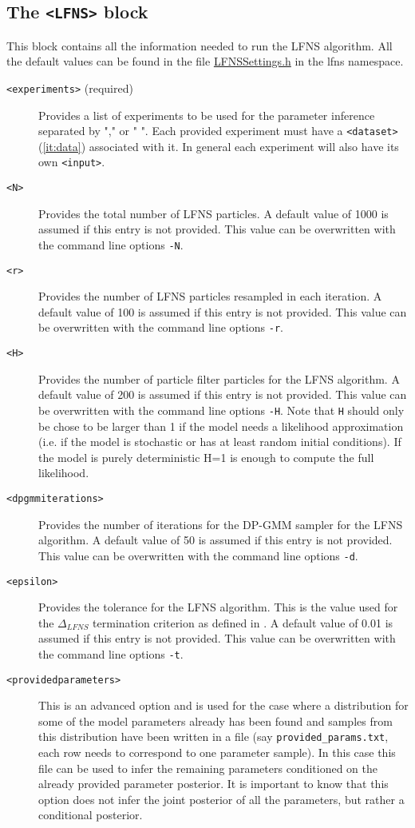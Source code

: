 \documentclass[11pt]{article} %
\begin{document}
\subsection{The \texttt{<LFNS>} block}
This block contains all the information needed to run the LFNS algorithm. All the default values can be found in the file \href{https://github.com/Mijan/LFNS/blob/publishable/src/LFNS/LFNSSettings.h}{LFNSSettings.h} in the lfns namespace. 
\begin{description}
\item[\texttt{<experiments>} (required)] Provides a list of experiments to be used for the parameter inference separated by "," or " ". Each provided experiment must have a \texttt{<dataset>} (\ref{it:data}) associated with it. In general each experiment will also have its own \texttt{<input>}. 
\item[\texttt{<N>}] Provides the total number of LFNS particles. A default value of 1000 is assumed if this entry is not provided. This value can be overwritten with the command line options \texttt{-N}.   
\item[\texttt{<r>}] Provides the number of LFNS particles resampled in each iteration. A default value of 100 is assumed if this entry is not provided. This value can be overwritten with the command line options \texttt{-r}.   
\item[\texttt{<H>}] Provides the number of particle filter particles for the LFNS algorithm. A default value of 200 is assumed if this entry is not provided. This value can be overwritten with the command line options \texttt{-H}. Note that \texttt{H} should only be chose to be larger than 1 if the model needs a likelihood approximation (i.e. if the model is stochastic or has at least random initial conditions). If the model is purely deterministic H=1 is enough to compute the full likelihood.   
\item[\texttt{<dpgmmiterations>}] Provides the number of iterations for the DP-GMM sampler for the LFNS algorithm. A default value of 50 is assumed if this entry is not provided. This value can be overwritten with the command line options \texttt{-d}.   
\item[\texttt{<epsilon>}] Provides the tolerance for the LFNS algorithm. This is the value used for the $\Delta_{LFNS}$ termination criterion as defined in \cite{mikelson2019likelihood}. A default value of 0.01 is assumed if this entry is not provided. This value can be overwritten with the command line options \texttt{-t}.   
\item[\texttt{<providedparameters>}] This is an advanced option and is used for the case where a distribution for some of the model parameters already has been found and samples from this distribution have been written in a file (say \texttt{provided\_params.txt}, each row needs to correspond to one parameter sample). In this case this file can be used to infer the remaining parameters conditioned on the already provided parameter posterior. It is important to know that this option does not infer the joint posterior of all the parameters, but rather a conditional posterior. 

\end{description}
\end{document}
